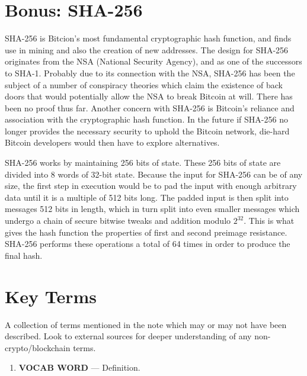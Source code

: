 \documentclass[full.tex]{subfiles}
\begin{document}
   \section*{Bonus: SHA-256}
   
   SHA-256 is Bitcion's most fundamental cryptographic hash function, and finds use in mining and also the creation of new addresses. The design for SHA-256 originates from the NSA (National Security Agency), and as one of the successors to SHA-1. Probably due to its connection with the NSA, SHA-256 has been the subject of a number of conspiracy theories which claim the existence of back doors that would potentially allow the NSA to break Bitcoin at will. There has been no proof thus far. Another concern with SHA-256 is Bitcoin's reliance and association with the cryptographic hash function. In the future if SHA-256 no longer provides the necessary security to uphold the Bitcoin network, die-hard Bitcoin developers would then have to explore alternatives.
   
   SHA-256 works by maintaining 256 bits of state. These 256 bits of state are divided into 8 words of 32-bit state. Because the input for SHA-256 can be of any size, the first step in execution would be to pad the input with enough arbitrary data until it is a multiple of 512 bits long. The padded input is then split into messages 512 bits in length, which in turn split into even smaller messages which undergo a chain of secure bitwise tweaks and addition modulo $2^{32}$. This is what gives the hash function the properties of first and second preimage resistance. SHA-256 performs these operations a total of 64 times in order to produce the final hash.
   
    
    
    \newpage
    \thispagestyle{firstpage}
    \vspace*{2\baselineskip}
    \section*{Key Terms}
    \noindent A collection of terms mentioned in the note which may or may not have been described. Look to external sources for deeper understanding of any non-crypto/blockchain terms.
    \begin{enumerate}
        \item \textbf{VOCAB WORD} --- Definition. %
    \end{enumerate}
\end{document}

